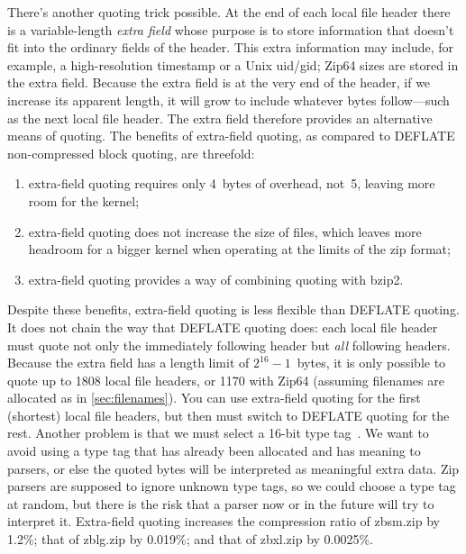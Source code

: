 \documentclass[letterpaper,twocolumn,10pt]{article}
\begin{document}
\label{para:extra}
There's another quoting trick possible.
At the end of each local file header
there is a variable-length
\emph{extra field} whose purpose is to store information
that doesn't fit into the ordinary fields of the header.
This extra information may include, for example,
a high-resolution timestamp or a Unix uid/gid;
Zip64 sizes are stored in the extra field.
Because the extra field is at the very end of the header,
if we increase its apparent length,
it will grow to include whatever bytes follow---such
as the next local file header.
The extra field therefore provides an alternative means of quoting.
The benefits of extra-field quoting,
as compared to DEFLATE non-compressed block quoting,
are threefold:
\begin{enumerate}
\item extra-field quoting requires only \SI{4}{bytes} of overhead,
not~\num{5}, leaving more room for the kernel;
\item extra-field quoting does not increase the size of files,
which leaves more headroom for a bigger kernel when
operating at the limits of the zip format;
\item extra-field quoting provides a way of combining quoting with bzip2.
\end{enumerate}
Despite these benefits, extra-field quoting is less flexible
than DEFLATE quoting.
It does not chain the way that DEFLATE quoting does:
each local file header must quote not only the immediately following header
but \emph{all} following headers.
Because the extra field has a length limit of
$2^{16}-1$~bytes,
it is only possible to quote up to \num{1808}
local file headers,
or \num{1170} with Zip64
(assuming filenames are allocated as in \autoref{sec:filenames}).
You can use extra-field quoting for the first (shortest) local file headers,
but then must switch to DEFLATE quoting for the rest.
Another problem is that we must select a 16-bit type tag~\cite[\S 4.5.2]{appnote}.
We want to avoid using a type tag that has already been allocated
and has meaning to parsers, or else the quoted bytes will be interpreted
as meaningful extra data.
Zip parsers are supposed to ignore unknown type tags,
so we could choose a type tag at random,
but there is the risk that a parser now or in the future
will try to interpret it.
Extra-field quoting increases the compression ratio of
zbsm.zip by 1.2\%;
that of zblg.zip by 0.019\%;
and that of zbxl.zip by 0.0025\%.
\end{document}
